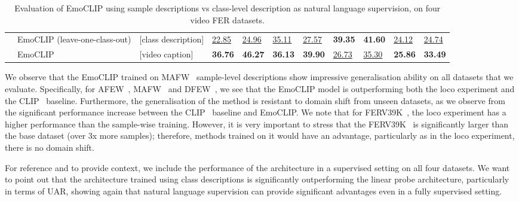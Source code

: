 \documentclass[10pt,twocolumn,letterpaper]{article}
\begin{document}
\begin{table*}[h]
\begin{tabular}{ll|l||ll|ll|ll|ll}
                            & EmoCLIP (leave-one-class-out) & {[}class description] & \uline{22.85}  & \uline{24.96}                                                 & \uline{35.11}  & \uline{27.57}                                                 & \textbf{39.35} & \textbf{41.60}                                                   & \uline{24.12}                             & \uline{24.74}                                       \\
                            & EmoCLIP                       & {[}video caption]     & \textbf{36.76} & \textbf{46.27}                                                & \textbf{36.13} & \textbf{39.90}                                                & \uline{26.73}  & \uline{35.30}                                                    & \textbf{25.86}                            & \textbf{33.49}                                     
\end{tabular}
\caption{Evaluation of EmoCLIP using sample descriptions vs class-level description as natural language supervision, on four video FER datasets.}
\label{tbl:supervised}
\end{table*}

We observe that the EmoCLIP trained on MAFW~\cite{liu_mafw_2022} sample-level descriptions show impressive generalisation ability on all datasets that we evaluate. Specifically, for AFEW~\cite{afew}, MAFW~\cite{liu_mafw_2022} and DFEW~\cite{dfew}, we see that the EmoCLIP model is outperforming both the loco experiment and the CLIP~\cite{radford_CLIP_2021} baseline. Furthermore, the generalisation of the method is resistant to domain shift from unseen datasets, as we observe from the significant performance increase between the CLIP~\cite{radford_CLIP_2021} baseline and EmoCLIP. We note that for FERV39K~\cite{ferv39k}, the loco experiment has a higher performance than the sample-wise training. However, it is very important to stress that the FERV39K~\cite{ferv39k} is significantly larger than the base dataset (over 3x more samples); therefore, methods trained on it would have an advantage, particularly as in the loco experiment, there is no domain shift. 

For reference and to provide context, we include the performance of the architecture in a supervised setting on all four datasets. We want to point out that the architecture trained using class descriptions is significantly outperforming the linear probe architecture, particularly in terms of UAR, showing again that natural language supervision can provide significant advantages even in a fully supervised setting.
\end{document}
